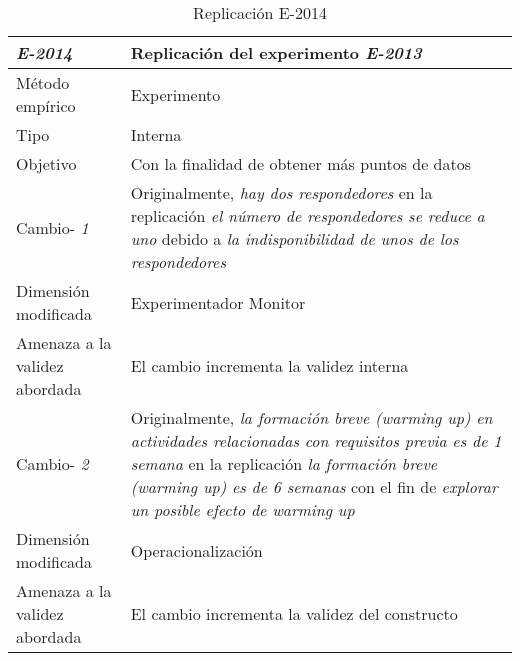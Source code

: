 
\begin{table}
\caption{Replicación E-2014}
\begin{tabular}{| p{3.3cm} | p{9cm} |}
\hline

\textbf {\textit{E-2014}} & Replicación del experimento \textit{E-2013 }    \\  \hline

Método empírico &  Experimento   \\  \hline
Tipo &  Interna   \\  \hline
Objetivo  &  Con la finalidad de obtener más puntos de datos \\  \hline \hline

 Cambio- \textit{1}   & \parbox[t]{9cm} {Originalmente,  \textit{hay dos respondedores} } \parbox[t]{9cm}{en la replicación \textit{ el número de respondedores se reduce a uno} }  debido a  \textit{la indisponibilidad de unos de los respondedores} \\  \hline
Dimensión modificada & 
 Experimentador Monitor  \\  \hline 
Amenaza a la validez abordada  & El cambio incrementa la validez interna  \\  \hline
 \hline
 
Cambio- \textit{2}   & \parbox[t]{9cm} {Originalmente,  \textit{la formación breve (warming up) en actividades relacionadas con requisitos  previa es de 1 semana} } \parbox[t]{9cm}{en la replicación \textit{ la formación breve (warming up) es de 6 semanas} }  con el fin de \textit{explorar un posible efecto de warming up } \\  \hline
Dimensión modificada & 
Operacionalización \\  \hline 
Amenaza a la validez abordada  & El cambio incrementa la validez del constructo  \\  \hline
 \hline


\end{tabular}
\label{tab:plantilla}
\end{table}





